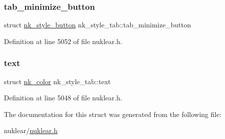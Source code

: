 \subsubsection{\texorpdfstring{tab\+\_\+minimize\+\_\+button}{tab\_minimize\_button}}
{\footnotesize\ttfamily struct \mbox{\hyperlink{structnk__style__button}{nk\+\_\+style\+\_\+button}} nk\+\_\+style\+\_\+tab\+::tab\+\_\+minimize\+\_\+button}



Definition at line 5052 of file nuklear.\+h.

\mbox{\label{structnk__style__tab_ad39a9118e595989bfe330ab5aad673a5}} 
\subsubsection{\texorpdfstring{text}{text}}
{\footnotesize\ttfamily struct \mbox{\hyperlink{structnk__color}{nk\+\_\+color}} nk\+\_\+style\+\_\+tab\+::text}



Definition at line 5048 of file nuklear.\+h.



The documentation for this struct was generated from the following file\+:\begin{DoxyCompactItemize}
\item 
nuklear/\mbox{\hyperlink{nuklear_8h}{nuklear.\+h}}\end{DoxyCompactItemize}
